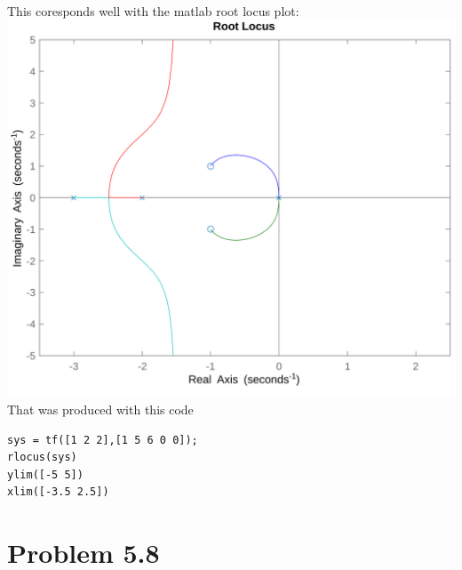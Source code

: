 \documentclass[12pt]{article}
\begin{document}
\\This coresponds well with the matlab root locus plot:\\
\includegraphics[scale=.2]{Problem2Matlab2.png}
\\That was produced with this code
\begin{verbatim}
sys = tf([1 2 2],[1 5 6 0 0]);
rlocus(sys)
ylim([-5 5])
xlim([-3.5 2.5])
\end{verbatim}
\section*{Problem 5.8}
\end{document}
